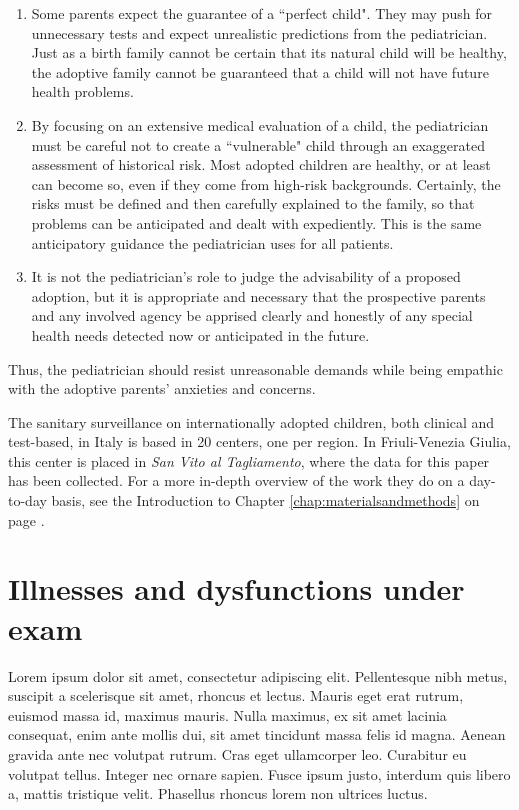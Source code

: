 \begin{enumerate}
    \item Some parents expect the guarantee of a ``perfect child". They may push for unnecessary tests and expect unrealistic predictions from the pediatrician. Just as a birth family cannot be certain that its natural child will be healthy, the adoptive family cannot be guaranteed that a child will not have future health problems.
    \item By focusing on an extensive medical evaluation of a child, the pediatrician must be careful not to create a ``vulnerable" child through an exaggerated assessment of historical risk. Most adopted children are healthy, or at least can become so, even if they come from high-risk backgrounds. Certainly, the risks must be defined and then carefully explained to the family, so that problems can be anticipated and dealt with expediently. This is the same anticipatory guidance the pediatrician uses for all patients.
    \item It is not the pediatrician's role to judge the advisability of a proposed adoption, but it is appropriate and necessary that the prospective parents and any involved agency be apprised clearly and honestly of any special health needs detected now or anticipated in the future.
\end{enumerate}

Thus, the pediatrician should resist unreasonable demands while being empathic with the adoptive parents' anxieties and concerns.

The sanitary surveillance on internationally adopted children, both clinical and test-based, in Italy is based in 20 centers, one per region. In Friuli-Venezia Giulia, this center is placed in \textit{San Vito al Tagliamento}, where the data for this paper has been collected. For a more in-depth overview of the work they do on a day-to-day basis, see the Introduction to Chapter \ref{chap:materialsandmethods} on page \pageref{chap:materialsandmethods}.

\section{Illnesses and dysfunctions under exam}\label{sec:illnessesanddysfunctions}
Lorem ipsum dolor sit amet, consectetur adipiscing elit. Pellentesque nibh metus, suscipit a scelerisque sit amet, rhoncus et lectus. Mauris eget erat rutrum, euismod massa id, maximus mauris. Nulla maximus, ex sit amet lacinia consequat, enim ante mollis dui, sit amet tincidunt massa felis id magna. Aenean gravida ante nec volutpat rutrum. Cras eget ullamcorper leo. Curabitur eu volutpat tellus. Integer nec ornare sapien. Fusce ipsum justo, interdum quis libero a, mattis tristique velit. Phasellus rhoncus lorem non ultrices luctus.

